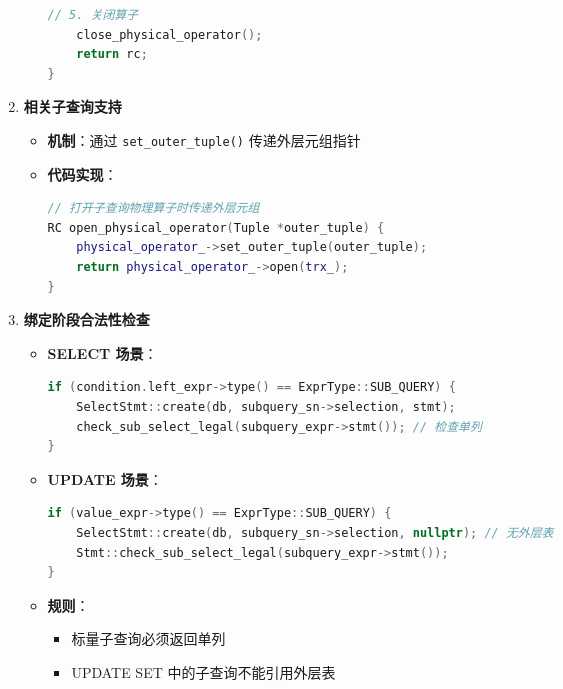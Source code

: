 \documentclass[a4paper, 12pt]{article}
\begin{document}
\begin{enumerate}
\begin{itemize}
\begin{lstlisting}[language=C++]
    // 5. 关闭算子
    close_physical_operator();
    return rc;
}
        \end{lstlisting}
    \end{itemize}

    \item \textbf{相关子查询支持}
    
\begin{itemize}
        \item \textbf{机制}：通过 \texttt{set\_outer\_tuple()} 传递外层元组指针
        \item \textbf{代码实现}：
        \begin{lstlisting}[language=C++]
// 打开子查询物理算子时传递外层元组
RC open_physical_operator(Tuple *outer_tuple) {
    physical_operator_->set_outer_tuple(outer_tuple);
    return physical_operator_->open(trx_);
}
        \end{lstlisting}
    \end{itemize}

    \item \textbf{绑定阶段合法性检查}
    
\begin{itemize}
        \item \textbf{SELECT 场景}：
        \begin{lstlisting}[language=C++]
if (condition.left_expr->type() == ExprType::SUB_QUERY) {
    SelectStmt::create(db, subquery_sn->selection, stmt);
    check_sub_select_legal(subquery_expr->stmt()); // 检查单列
}
        \end{lstlisting}
        
        \item \textbf{UPDATE 场景}：
        
\begin{lstlisting}[language=C++]
if (value_expr->type() == ExprType::SUB_QUERY) {
    SelectStmt::create(db, subquery_sn->selection, nullptr); // 无外层表
    Stmt::check_sub_select_legal(subquery_expr->stmt());
}
        \end{lstlisting}
        \item \textbf{规则}：
        
\begin{itemize}
            \item 标量子查询必须返回单列
            \item UPDATE SET 中的子查询不能引用外层表
        \end{itemize}
    \end{itemize}


\end{enumerate}
\end{document}
